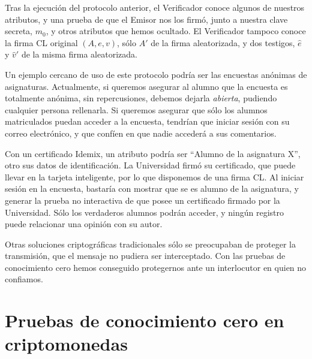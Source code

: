 Tras la ejecución del protocolo anterior, el Verificador conoce algunos de nuestros atributos, y una prueba de que el Emisor nos los firmó, junto a nuestra clave secreta, $m_0$, y otros atributos que hemos ocultado. El Verificador tampoco conoce la firma CL original $(A,e,v)$, sólo $A'$ de la firma aleatorizada, y dos testigos, $\hat{e}$ y $\hat{v}'$ de la misma firma aleatorizada.

Un ejemplo cercano de uso de este protocolo podría ser las encuestas anónimas de asignaturas. Actualmente, si queremos asegurar al alumno que la encuesta es totalmente anónima, sin repercusiones, debemos dejarla \textit{abierta}, pudiendo cualquier persona rellenarla. Si queremos asegurar que sólo los alumnos matriculados puedan acceder a la encuesta, tendrían que iniciar sesión con su correo electrónico, y que confíen en que nadie accederá a sus comentarios.

Con un certificado Idemix, un atributo podría ser ``Alumno de la asignatura X'', otro sus datos de identificación. La Universidad firmó su certificado, que puede llevar en la tarjeta inteligente, por lo que disponemos de una firma CL. Al iniciar sesión en la encuesta, bastaría con mostrar que se es alumno de la asignatura, y generar la prueba no interactiva de que posee un certificado firmado por la Universidad. Sólo los verdaderos alumnos podrán acceder, y ningún registro puede relacionar una opinión con su autor.

Otras soluciones criptográficas tradicionales sólo se preocupaban de proteger la transmisión, que el mensaje no pudiera ser interceptado. Con las pruebas de conocimiento cero hemos conseguido protegernos ante un interlocutor en quien no confiamos.




\section{Pruebas de conocimiento cero en criptomonedas}





